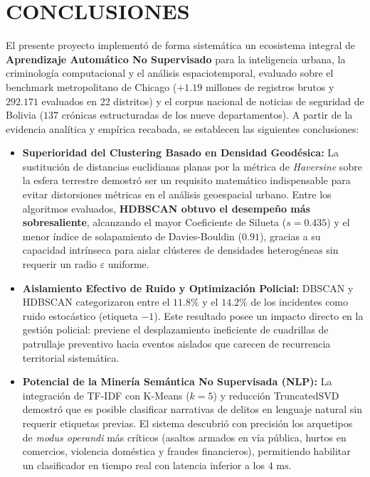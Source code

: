 \section{CONCLUSIONES}

El presente proyecto implementó de forma sistemática un ecosistema integral de \textbf{Aprendizaje Automático No Supervisado} para la inteligencia urbana, la criminología computacional y el análisis espaciotemporal, evaluado sobre el benchmark metropolitano de Chicago ($+1.19$ millones de registros brutos y $292.171$ evaluados en 22 distritos) y el corpus nacional de noticias de seguridad de Bolivia ($137$ crónicas estructuradas de los nueve departamentos). A partir de la evidencia analítica y empírica recabada, se establecen las siguientes conclusiones:

\begin{itemize}
    \item \textbf{Superioridad del Clustering Basado en Densidad Geodésica:} La sustitución de distancias euclidianas planas por la métrica de \textit{Haversine} sobre la esfera terrestre demostró ser un requisito matemático indispensable para evitar distorsiones métricas en el análisis geoespacial urbano. Entre los algoritmos evaluados, \textbf{HDBSCAN obtuvo el desempeño más sobresaliente}, alcanzando el mayor Coeficiente de Silueta ($s = 0.435$) y el menor índice de solapamiento de Davies-Bouldin ($0.91$), gracias a su capacidad intrínseca para aislar clústeres de densidades heterogéneas sin requerir un radio $\varepsilon$ uniforme.
    
    \item \textbf{Aislamiento Efectivo de Ruido y Optimización Policial:} DBSCAN y HDBSCAN categorizaron entre el $11.8\%$ y el $14.2\%$ de los incidentes como ruido estocástico (etiqueta $-1$). Este resultado posee un impacto directo en la gestión policial: previene el desplazamiento ineficiente de cuadrillas de patrullaje preventivo hacia eventos aislados que carecen de recurrencia territorial sistemática.
    
    \item \textbf{Potencial de la Minería Semántica No Supervisada (NLP):} La integración de TF-IDF con K-Means ($k=5$) y reducción TruncatedSVD demostró que es posible clasificar narrativas de delitos en lenguaje natural sin requerir etiquetas previas. El sistema descubrió con precisión los arquetipos de \textit{modus operandi} más críticos (asaltos armados en vía pública, hurtos en comercios, violencia doméstica y fraudes financieros), permitiendo habilitar un clasificador en tiempo real con latencia inferior a los $4\text{ ms}$.
    

\end{itemize}
